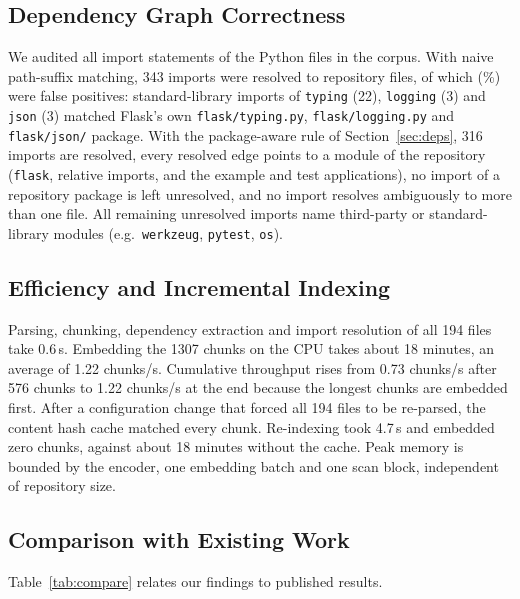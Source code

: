 \documentclass[conference]{IEEEtran}
\begin{document}
\subsection{Dependency Graph Correctness}
We audited all import statements of the Python files in the corpus. With naive
path-suffix matching, 343 imports were resolved to repository files, of which
\FalseEdges{} (\FalseEdgePct{}\%) were false positives: standard-library imports
of \texttt{typing} (22), \texttt{logging} (3) and \texttt{json} (3) matched
Flask's own \texttt{flask/typing.py}, \texttt{flask/logging.py} and
\texttt{flask/json/} package. With the package-aware rule of
Section~\ref{sec:deps}, 316 imports are resolved, every resolved edge points to a
module of the repository (\texttt{flask}, relative imports, and the example and
test applications), no import of a repository package is left unresolved, and
no import resolves ambiguously to more than one file. All remaining unresolved
imports name third-party or standard-library modules (e.g.\ \texttt{werkzeug},
\texttt{pytest}, \texttt{os}).

\subsection{Efficiency and Incremental Indexing}
Parsing, chunking, dependency extraction and import resolution of all 194
files take 0.6\,s. Embedding the 1307 chunks on the CPU takes about 18
minutes, an average of 1.22 chunks/s. Cumulative throughput rises from 0.73
chunks/s after 576 chunks to 1.22 chunks/s at the end because the longest
chunks are embedded first. \QueryLatency{} After a configuration change that
forced all 194 files to be re-parsed, the content hash cache matched every
chunk. Re-indexing took 4.7\,s and embedded zero chunks, against about 18
minutes without the cache. Peak memory is bounded
by the encoder, one embedding batch and one scan block, independent of
repository size.

\subsection{Comparison with Existing Work}
Table~\ref{tab:compare} relates our findings to published results.
\end{document}
